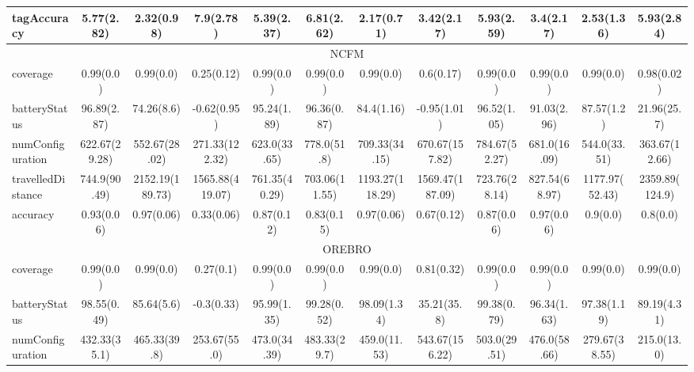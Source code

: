 \documentclass{article}
\begin{document}
\begin{table}
{\begin{tabular}{l|ccccccccccc}
    tagAccuracy & 5.77(2.82) & 2.32(0.98) & 7.9(2.78) & 5.39(2.37) & 6.81(2.62) & 2.17(0.71) & 3.42(2.17) & 5.93(2.59) & 3.4(2.17) & 2.53(1.36) & 5.93(2.84) \\ \hline
    \multicolumn{12}{c}{NCFM} \\ \hline
    coverage & 0.99(0.0) & 0.99(0.0) & 0.25(0.12) & 0.99(0.0) & 0.99(0.0) & 0.99(0.0) & 0.6(0.17) & 0.99(0.0) & 0.99(0.0) & 0.99(0.0) & 0.98(0.02) \\ 
    batteryStatus & 96.89(2.87) & 74.26(8.6) & -0.62(0.95) & 95.24(1.89) & 96.36(0.87) & 84.4(1.16) & -0.95(1.01) & 96.52(1.05) & 91.03(2.96) & 87.57(1.2) & 21.96(25.7) \\ 
    numConfiguration & 622.67(29.28) & 552.67(28.02) & 271.33(122.32) & 623.0(33.65) & 778.0(51.8) & 709.33(34.15) & 670.67(157.82) & 784.67(52.27) & 681.0(16.09) & 544.0(33.51) & 363.67(12.66) \\ 
    travelledDistance & 744.9(90.49) & 2152.19(189.73) & 1565.88(419.07) & 761.35(40.29) & 703.06(11.55) & 1193.27(118.29) & 1569.47(187.09) & 723.76(28.14) & 827.54(68.97) & 1177.97(52.43) & 2359.89(124.9) \\ 
    accuracy & 0.93(0.06) & 0.97(0.06) & 0.33(0.06) & 0.87(0.12) & 0.83(0.15) & 0.97(0.06) & 0.67(0.12) & 0.87(0.06) & 0.97(0.06) & 0.9(0.0) & 0.8(0.0) \\ \hline
    \multicolumn{12}{c}{OREBRO} \\ \hline
    coverage & 0.99(0.0) & 0.99(0.0) & 0.27(0.1) & 0.99(0.0) & 0.99(0.0) & 0.99(0.0) & 0.81(0.32) & 0.99(0.0) & 0.99(0.0) & 0.99(0.0) & 0.99(0.0) \\
    batteryStatus & 98.55(0.49) & 85.64(5.6) & -0.3(0.33) & 95.99(1.35) & 99.28(0.52) & 98.09(1.34) & 35.21(35.8) & 99.38(0.79) & 96.34(1.63) & 97.38(1.19) & 89.19(4.31) \\
    numConfiguration & 432.33(35.1) & 465.33(39.8) & 253.67(55.0) & 473.0(34.39) & 483.33(29.7) & 459.0(11.53) & 543.67(156.22) & 503.0(29.51) & 476.0(58.66) & 279.67(38.55) & 215.0(13.0) \\

\end{tabular}}
\end{table}
\end{document}
